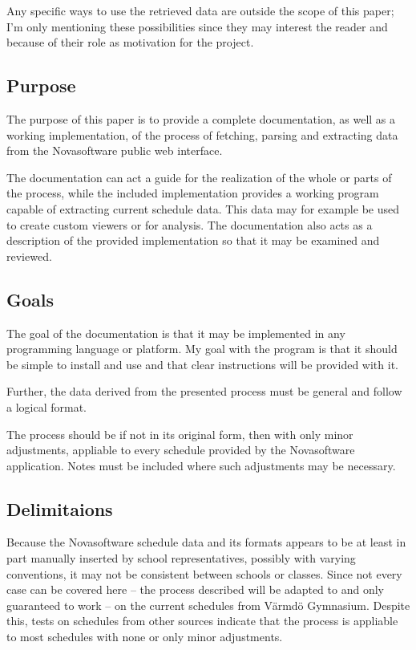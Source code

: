 \documentclass{article}
\begin{document}
	Any specific ways to use the retrieved data are outside the scope of this paper; I'm only mentioning these possibilities since they may interest the reader and because of their role as motivation for the project.
	
	\subsection{Purpose}
	The purpose of this paper is to provide a complete documentation, as well as a working implementation, of the process of fetching, parsing and extracting data from the Novasoftware public web interface. 
	
	The documentation can act a guide for the realization of the whole or parts of the process, while the included implementation provides a working program capable of extracting current schedule data. This data may for example be used to create custom viewers or for analysis. The documentation also acts as a description of the provided implementation so that it may be examined and reviewed.
	
	\subsection{Goals}
	The goal of the documentation is that it may be implemented in any programming language or platform. My goal with the program is that it should be simple to install and use and that clear instructions will be provided with it.
	
	Further, the data derived from the presented process must be general and follow a logical format.
	
	The process should be if not in its original form, then with only minor adjustments, appliable to every schedule provided by the Novasoftware application. Notes must be included where such adjustments may be necessary.
	
	\subsection{Delimitaions}
	Because the Novasoftware schedule data and its formats appears to be at least in part manually inserted by school representatives, possibly with varying conventions, it may not be consistent between schools or classes. Since not every case can be covered here -- the process described will be adapted to and only guaranteed to work -- on the current schedules from Värmdö Gymnasium. Despite this, tests on schedules from other sources indicate that the process is appliable to most schedules with none or only minor adjustments.
	
\end{document}
